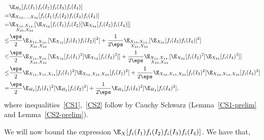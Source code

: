 \begin{align}
&\E_{H_2}[ f_i(I_1) f_i(I_2) f_i(I_3) f_i(I_4)] \nonumber\\
= &\E_{X_{12},\ldots,X_{34}}[f_i(I_1) f_i(I_2) f_i(I_3) f_i(I_4)] \nonumber\\
= &\E_{\substack{X_{13},X_{14},\\ X_{23},X_{24}}}[\E_{X_{12}}[f_i(I_1) f_i(I_2)]\E_{X_{34}}[f_i(I_3) f_i(I_4)] ] \nonumber\\
\leq &\frac{\eps}{2}\E_{\substack{X_{13},X_{14},\\ X_{23},X_{24}}}[\E_{X_{12}}[f_i(I_1) f_i(I_2)]^2] +  \frac{1}{2\eps}\E_{\substack{X_{13},X_{14},\\ X_{23},X_{24}}}[\E_{X_{34}}[f_i(I_3) f_i(I_4)]^2] \label{CS1} \\
\leq &\frac{\eps}{2}\E_{\substack{X_{13},X_{14},\\ X_{23},X_{24}}}[\E_{X_{12}}[f_i(I_1)^2]\E_{X_{12}}[f_i(I_2)^2]] +  \frac{1}{2\eps}\E_{\substack{X_{13},X_{14},\\ X_{23},X_{24}}}[\E_{X_{34}}[f_i(I_3)^2]\E_{X_{34}}[f_i(I_4)^2]]\label{CS2} \\
\leq &\frac{\eps}{2}\E_{X_{12},X_{13},X_{14}}[f_i(I_1)^2]\E_{X_{12},X_{23},X_{24}}[f_i(I_2)^2] +  \frac{1}{2\eps}\E_{X_{34},X_{13},X_{23}}[f_i(I_3)^2]\E_{X_{34},X_{14},X_{24}}[f_i(I_4)^2] \nonumber \\
= &\frac{\eps}{2}\E_{H_2}[f_i(I_1)^2]\E_{H_2}[f_i(I_2)^2] +  \frac{1}{2\eps}\E_{H_2}[f_i(I_3)^2]\E_{H_2}[f_i(I_4)^2],\label{last-eq} 
\end{align}
where inequalities~\eqref{CS1},~\eqref{CS2} follow by Cauchy Schwarz (Lemma~\ref{CS1-prelim} and Lemma~\ref{CS2-prelim}). 


\bigskip


We will now bound the expression $\E_X[f_i(I_1)f_i(I_2)f_i(I_3)f_i(I_4)]$. We have that,

